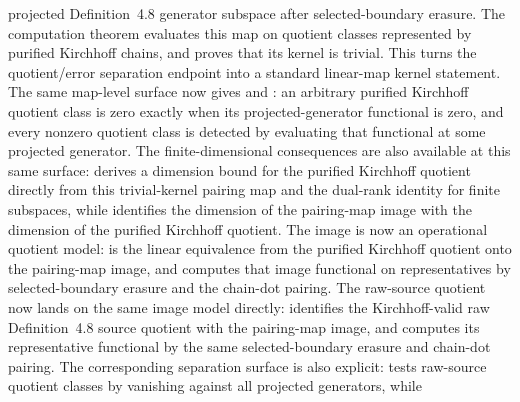 \documentclass[11pt]{article}
\begin{document}
projected Definition~4.8 generator subspace after selected-boundary erasure.
The computation theorem
evaluates this map on quotient classes represented by purified Kirchhoff chains,
and
proves that its kernel is trivial.  This turns the quotient/error separation
endpoint into a standard linear-map kernel statement.  The same map-level
surface now gives
and
:
an arbitrary purified Kirchhoff quotient class is zero exactly when its
projected-generator functional is zero, and every nonzero quotient class is
detected by evaluating that functional at some projected generator.  The
finite-dimensional consequences are also available at this same surface:
derives a dimension bound for the purified Kirchhoff quotient directly from
this trivial-kernel pairing map and the dual-rank identity for finite
subspaces, while
identifies the dimension of the pairing-map image with the dimension of the
purified Kirchhoff quotient.  The image is now an operational quotient model:
is the linear equivalence from the purified Kirchhoff quotient onto the
pairing-map image, and
computes that image functional on representatives by selected-boundary erasure
and the chain-dot pairing.  The raw-source quotient now lands on the same image
model directly:
identifies the Kirchhoff-valid raw Definition~4.8 source quotient with the
pairing-map image, and
computes its representative functional by the same selected-boundary erasure
and chain-dot pairing.  The corresponding separation surface is also explicit:
tests raw-source quotient classes by vanishing against all projected generators,
while
\end{document}
